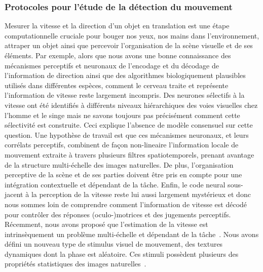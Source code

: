 \subsubsection{Protocoles pour l'étude de la détection du mouvement~\citep{Vacher16}}%
\label{sec:motionclouds}
Mesurer la vitesse et la direction d'un objet en translation est une étape computationnelle cruciale pour bouger nos yeux, nos mains dans l'environnement, attraper un objet ainsi que percevoir l'organisation de la scène visuelle et de ses éléments. Par exemple, alors que nous avons une bonne connaissance des mécanismes perceptifs et neuronaux de l'encodage et du décodage de l'information de direction ainsi que des algorithmes biologiquement plausibles utilisés dans différentes espèces, comment le cerveau traite et représente l'information de vitesse reste largement incompris. Des neurones sélectifs à la vitesse ont été identifiés à différents niveaux hiérarchiques des voies visuelles chez l'homme et le singe mais ne savons toujours pas précisément comment cette sélectivité est construite. Ceci explique l'absence de modèle consensuel sur cette question. Une hypothèse de travail est que ces mécanismes neuronaux, et leurs corrélats perceptifs, combinent de façon non-lineaire l'information locale de mouvement extraite à travers plusieurs filtres spatiotemporels, prenant avantage de la structure multi-échelle des images naturelles. De plus, l'organisation perceptive de la scène et de ses parties doivent être pris en compte pour une intégration contextuelle et dépendant de la tâche. Enfin, le code neural sous-jacent à la perception de la vitesse reste lui aussi largement mystérieux et donc nous sommes loin de comprendre comment l'information de vitesse est décodé pour contrôler des réponses (oculo-)motrices et des jugements perceptifs. Récemment, nous avons proposé que l'estimation de la vitesse est intrinsèquement un problème multi-échelle et dépendant de la tâche~\citep{Simoncini12}. Nous avons défini un nouveau type de stimulus visuel de mouvement, des textures dynamiques dont la phase est aléatoire. Ces stimuli possèdent plusieurs des propriétés statistiques des images naturelles~\citep{Sanz12,Vacher15nips}.


